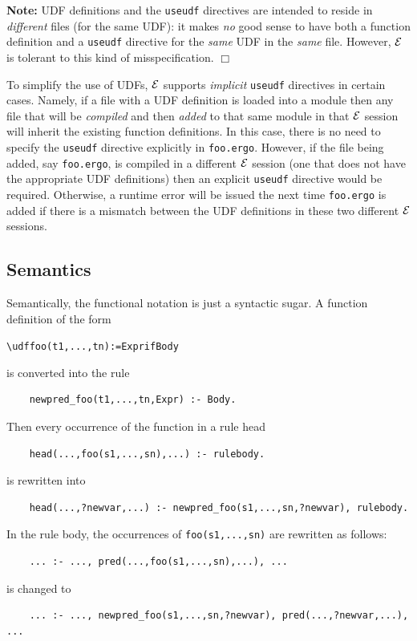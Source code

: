 \documentclass[11pt]{article}
\newcommand{\ERGO}{\mbox{\ensuremath{\cal{E}}\smaller{{\sc{RGO}}}}\xspace}
\newcommand{\FLSYSTEM}{\ERGO}
\newcommand{\ergoext}{ergo\xspace}
\newcommand{\bs}{\textbackslash}
\begin{document}
\noindent
\textbf{Note:} UDF definitions and the \texttt{useudf} directives are intended
to reside in \emph{different} files (for the same UDF):
it makes \emph{no} good sense to have both a function definition and a
\texttt{useudf} directive for the \emph{same} UDF in the \emph{same}
file. However, \FLSYSTEM is tolerant to this kind of misspecification.
\hfill$\Box$

To simplify the use of UDFs, \FLSYSTEM supports \emph{implicit}
\texttt{useudf} directives in certain cases. Namely, if a file with
a UDF definition is loaded into a module then any file that will be
\emph{compiled} and then \emph{added} to that same module in that \FLSYSTEM session
will inherit the existing function definitions. In this case, there is no
need to specify the \texttt{useudf} directive explicitly in
\texttt{foo.\ergoext}.
However, if the file being added, say \texttt{foo.\ergoext},
is compiled in a different \FLSYSTEM session
(one that does not have the appropriate UDF definitions) then an explicit
\texttt{useudf} directive would be required. Otherwise, a runtime
error will be issued the next time \texttt{foo.\ergoext} is added if there is a
mismatch between the UDF definitions in these two different \FLSYSTEM sessions. 


\subsection{Semantics}

Semantically,
the functional notation is just a syntactic sugar. A function definition
of the form
\begin{alltt}
    \bs{}udf foo(t1,...,tn) := Expr if Body
\end{alltt}
is converted into the rule
\begin{verbatim}
    newpred_foo(t1,...,tn,Expr) :- Body.
\end{verbatim}
Then every occurrence of the function in a rule head
\begin{verbatim}
    head(...,foo(s1,...,sn),...) :- rulebody.
\end{verbatim}
is rewritten into
\begin{verbatim}
    head(...,?newvar,...) :- newpred_foo(s1,...,sn,?newvar), rulebody.
\end{verbatim}
In the rule body, the occurrences of \texttt{foo(s1,...,sn)}  are rewritten as
follows:
\begin{verbatim}
    ... :- ..., pred(...,foo(s1,...,sn),...), ...
\end{verbatim}
is changed to
\begin{verbatim}
    ... :- ..., newpred_foo(s1,...,sn,?newvar), pred(...,?newvar,...), ...
\end{verbatim}
\end{document}
